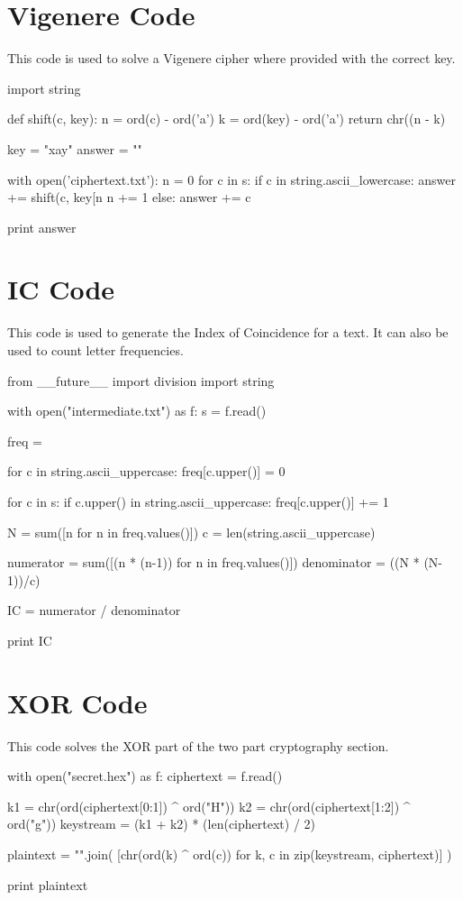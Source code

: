 \documentclass[11pt,a4paper,twoside]{article}
\begin{document}
\section{Vigenere Code}
\label{vig_code}
This code is used to solve a Vigenere cipher where provided with the correct
key. 
\begin{python}
import string

def shift(c, key):
    n = ord(c) - ord('a')
    k = ord(key) - ord('a')
    return chr((n - k) %

key = "xay"
answer = ""

with open('ciphertext.txt'):
    n = 0
    for c in s:
        if c in string.ascii_lowercase:
            answer += shift(c, key[n%
            n += 1
        else:
            answer += c
        
print answer
\end{python}

\vfill
\pagebreak

\section{IC Code}
\label{IC_code}
This code is used to generate the Index of Coincidence for a text. It can also
be used to count letter frequencies. 
\begin{python}
from __future__ import division
import string

with open("intermediate.txt") as f: 
    s = f.read()

    freq = {}

    for c in string.ascii_uppercase:
        freq[c.upper()] = 0

    for c in s:
        if c.upper() in string.ascii_uppercase:
            freq[c.upper()] += 1
                           
    N = sum([n for n in freq.values()])
    c = len(string.ascii_uppercase)

    numerator = sum([(n * (n-1)) for n in freq.values()]) 
    denominator = ((N * (N-1))/c)

    IC = numerator / denominator 

    print IC
\end{python}

\section{XOR Code}
\label{XOR_code}
This code solves the XOR part of the two part cryptography section. 
\begin{python}
with open("secret.hex") as f:
    ciphertext = f.read()

    k1 = chr(ord(ciphertext[0:1]) ^ ord("H"))
    k2 = chr(ord(ciphertext[1:2]) ^ ord("g"))
    keystream = (k1 + k2) * (len(ciphertext) / 2)

    plaintext = "".join(
            [chr(ord(k) ^ ord(c)) 
             for k, c in zip(keystream, ciphertext)]
    )

    print plaintext
\end{python}
\end{document}
